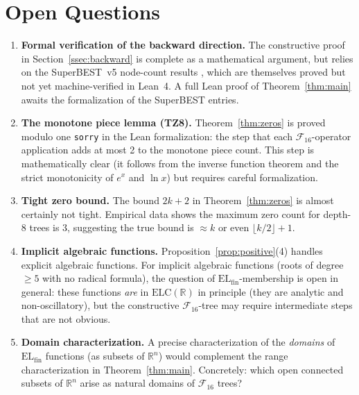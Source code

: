 \documentclass[12pt,a4paper]{article}
\theoremstyle{definition}
\newcommand{\F}{\mathcal{F}_{16}}
\newcommand{\ELfin}{\mathrm{EL}_{\mathrm{fin}}}
\newcommand{\ELC}{\mathrm{ELC}(\mathbb{R})}
\newcommand{\R}{\mathbb{R}}
\begin{document}
\section{Open Questions}
\label{sec:open}

\begin{enumerate}
  \item \textbf{Formal verification of the backward direction.}
        The constructive proof in Section~\ref{ssec:backward} is complete as a
        mathematical argument, but relies on the SuperBEST~v5 node-count results
        \cite{SB5}, which are themselves proved but not yet machine-verified in
        Lean~4.  A full Lean proof of Theorem~\ref{thm:main} awaits the
        formalization of the SuperBEST entries.

  \item \textbf{The monotone piece lemma (TZ8).}
        Theorem~\ref{thm:zeros} is proved modulo one \texttt{sorry} in the Lean
        formalization: the step that each $\F$-operator application adds at most
        2 to the monotone piece count.  This step is mathematically clear
        (it follows from the inverse function theorem and the strict monotonicity
        of $e^x$ and $\ln x$) but requires careful formalization.

  \item \textbf{Tight zero bound.}
        The bound $2k+2$ in Theorem~\ref{thm:zeros} is almost certainly not
        tight.  Empirical data \cite{TZ5} shows the maximum zero count for
        depth-8 trees is 3, suggesting the true bound is $\approx k$ or even
        $\lfloor k/2\rfloor + 1$.

  \item \textbf{Implicit algebraic functions.}
        Proposition~\ref{prop:positive}(4) handles explicit algebraic functions.
        For implicit algebraic functions (roots of degree $\ge 5$ with no radical
        formula), the question of $\ELfin$-membership is open in general: these
        functions \emph{are} in $\ELC$ in principle (they are analytic and
        non-oscillatory), but the constructive $\F$-tree may require intermediate
        steps that are not obvious.

  \item \textbf{Domain characterization.}
        A precise characterization of the \emph{domains} of $\ELfin$ functions
        (as subsets of $\R^n$) would complement the range characterization in
        Theorem~\ref{thm:main}.  Concretely: which open connected subsets of
        $\R^n$ arise as natural domains of $\F$ trees?
\end{enumerate}
\end{document}
